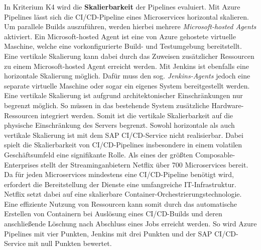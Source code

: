 In Kriterium K4 wird die \textbf{Skalierbarkeit} der Pipelines evaluiert. Mit Azure Pipelines lässt sich die CI/CD-Pipeline eines Microservices horizontal skalieren. Um parallele Builds auszuführen, werden hierbei mehrere \textit{Microsoft-hosted Agents} aktiviert. Ein Microsoft-hosted Agent ist eine von Azure gehostete virtuelle Maschine, welche eine vorkonfigurierte Build- und Testumgebung bereitstellt. Eine vertikale Skalierung kann dabei durch das Zuweisen zusätzlicher Ressourcen zu einem Microsoft-hosted Agent erreicht werden. Mit Jenkins ist ebenfalls eine horizontale Skalierung möglich. Dafür muss den sog. \textit{Jenkins-Agents} jedoch eine separate virtuelle Maschine oder sogar ein eigenes System bereitgestellt werden. Eine vertikale Skalierung ist aufgrund architektonischer Einschränkungen nur begrenzt möglich. So müssen in das bestehende System zusätzliche Hardware-Ressourcen integriert werden. Somit ist die vertikale Skalierbarkeit auf die physische Einschränkung des Servers begrenzt. Sowohl horizontale als auch vertikale Skalierung ist mit dem SAP CI/CD-Service nicht realisierbar. Dabei spielt die Skalierbarkeit von CI/CD-Pipelines insbesondere in einem volatilen Geschäftsumfeld eine signifikante Rolle. Als eines der größten Composable-Enterprises stellt der Streaminganbietern Netflix über 700 Microservices bereit. Da für jeden Microservices mindestens eine CI/CD-Pipeline benötigt wird, erfordert die  Bereitstellung der Dienste eine umfangreiche IT-Infrastruktur. Netflix setzt dabei auf eine skalierbare Container-Orchestrierungstechnologie. Eine effiziente Nutzung von Ressourcen kann somit durch das automatische Erstellen von Containern bei Auslösung eines CI/CD-Builds und deren anschließende Löschung nach Abschluss eines Jobs erreicht werden. So wird Azure Pipelines mit vier Punkten, Jenkins mit drei Punkten und der SAP CI/CD-Service mit null Punkten bewertet. 
